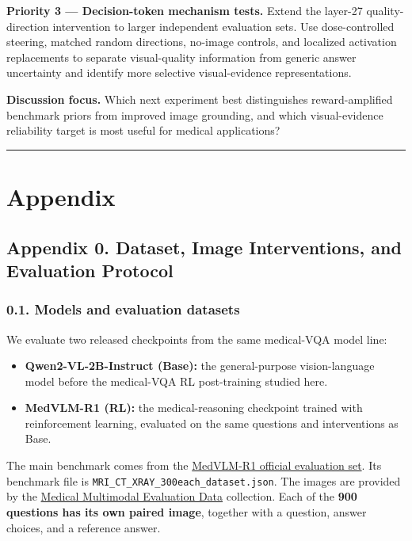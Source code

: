 \documentclass[
  10pt,
  a4paper,
]{article}
\providecommand{\tightlist}{%
  \setlength{\itemsep}{0pt}\setlength{\parskip}{0pt}}
\begin{document}
\textbf{Priority 3 --- Decision-token mechanism tests.} Extend the
layer-27 quality-direction intervention to larger independent evaluation
sets. Use dose-controlled steering, matched random directions, no-image
controls, and localized activation replacements to separate
visual-quality information from generic answer uncertainty and identify
more selective visual-evidence representations.

\textbf{Discussion focus.} Which next experiment best distinguishes
reward-amplified benchmark priors from improved image grounding, and
which visual-evidence reliability target is most useful for medical
applications?

\begin{center}\rule{0.5\linewidth}{0.5pt}\end{center}

\section{Appendix}\label{appendix}

\subsection{Appendix 0. Dataset, Image Interventions, and Evaluation
Protocol}\label{appendix-0.-dataset-image-interventions-and-evaluation-protocol}

\subsubsection{0.1. Models and evaluation
datasets}\label{models-and-evaluation-datasets}

We evaluate two released checkpoints from the same medical-VQA model
line:

\begin{itemize}
\tightlist
\item
  \textbf{Qwen2-VL-2B-Instruct (Base):} the general-purpose
  vision-language model before the medical-VQA RL post-training studied
  here.
\item
  \textbf{MedVLM-R1 (RL):} the medical-reasoning checkpoint trained with
  reinforcement learning, evaluated on the same questions and
  interventions as Base.
\end{itemize}

The main benchmark comes from the
\href{https://github.com/JZPeterPan/MedVLM-R1}{MedVLM-R1 official
evaluation set}. Its benchmark file is
\texttt{MRI\_CT\_XRAY\_300each\_dataset.json}. The images are provided
by the
\href{https://huggingface.co/datasets/FreedomIntelligence/Medical_Multimodal_Evaluation_Data}{Medical
Multimodal Evaluation Data} collection. Each of the \textbf{900
questions has its own paired image}, together with a question, answer
choices, and a reference answer.
\end{document}
